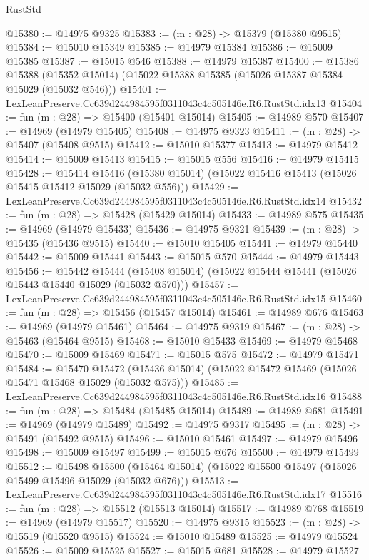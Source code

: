 \begin{lexlean}{RustStd}
\begin{coremodule}
@15380 := @14975 @9325
@15383 := (m : @28) -> @15379 (@15380 @9515)
@15384 := @15010 @15349
@15385 := @14979 @15384
@15386 := @15009 @15385
@15387 := @15015 @546
@15388 := @14979 @15387
@15400 := @15386
    @15388
    (@15352 @15014)
    (@15022 @15388 @15385 (@15026 @15387 @15384 @15029 (@15032 @546)))
@15401 := LexLeanPreserve.Cc639d244984595f0311043c4c505146e.R6.RustStd.idx13
@15404 := fun (m : @28) => @15400 (@15401 @15014)
@15405 := @14989 @570
@15407 := @14969 (@14979 @15405)
@15408 := @14975 @9323
@15411 := (m : @28) -> @15407 (@15408 @9515)
@15412 := @15010 @15377
@15413 := @14979 @15412
@15414 := @15009 @15413
@15415 := @15015 @556
@15416 := @14979 @15415
@15428 := @15414
    @15416
    (@15380 @15014)
    (@15022 @15416 @15413 (@15026 @15415 @15412 @15029 (@15032 @556)))
@15429 := LexLeanPreserve.Cc639d244984595f0311043c4c505146e.R6.RustStd.idx14
@15432 := fun (m : @28) => @15428 (@15429 @15014)
@15433 := @14989 @575
@15435 := @14969 (@14979 @15433)
@15436 := @14975 @9321
@15439 := (m : @28) -> @15435 (@15436 @9515)
@15440 := @15010 @15405
@15441 := @14979 @15440
@15442 := @15009 @15441
@15443 := @15015 @570
@15444 := @14979 @15443
@15456 := @15442
    @15444
    (@15408 @15014)
    (@15022 @15444 @15441 (@15026 @15443 @15440 @15029 (@15032 @570)))
@15457 := LexLeanPreserve.Cc639d244984595f0311043c4c505146e.R6.RustStd.idx15
@15460 := fun (m : @28) => @15456 (@15457 @15014)
@15461 := @14989 @676
@15463 := @14969 (@14979 @15461)
@15464 := @14975 @9319
@15467 := (m : @28) -> @15463 (@15464 @9515)
@15468 := @15010 @15433
@15469 := @14979 @15468
@15470 := @15009 @15469
@15471 := @15015 @575
@15472 := @14979 @15471
@15484 := @15470
    @15472
    (@15436 @15014)
    (@15022 @15472 @15469 (@15026 @15471 @15468 @15029 (@15032 @575)))
@15485 := LexLeanPreserve.Cc639d244984595f0311043c4c505146e.R6.RustStd.idx16
@15488 := fun (m : @28) => @15484 (@15485 @15014)
@15489 := @14989 @681
@15491 := @14969 (@14979 @15489)
@15492 := @14975 @9317
@15495 := (m : @28) -> @15491 (@15492 @9515)
@15496 := @15010 @15461
@15497 := @14979 @15496
@15498 := @15009 @15497
@15499 := @15015 @676
@15500 := @14979 @15499
@15512 := @15498
    @15500
    (@15464 @15014)
    (@15022 @15500 @15497 (@15026 @15499 @15496 @15029 (@15032 @676)))
@15513 := LexLeanPreserve.Cc639d244984595f0311043c4c505146e.R6.RustStd.idx17
@15516 := fun (m : @28) => @15512 (@15513 @15014)
@15517 := @14989 @768
@15519 := @14969 (@14979 @15517)
@15520 := @14975 @9315
@15523 := (m : @28) -> @15519 (@15520 @9515)
@15524 := @15010 @15489
@15525 := @14979 @15524
@15526 := @15009 @15525
@15527 := @15015 @681
@15528 := @14979 @15527

\end{coremodule}
\end{lexlean}
